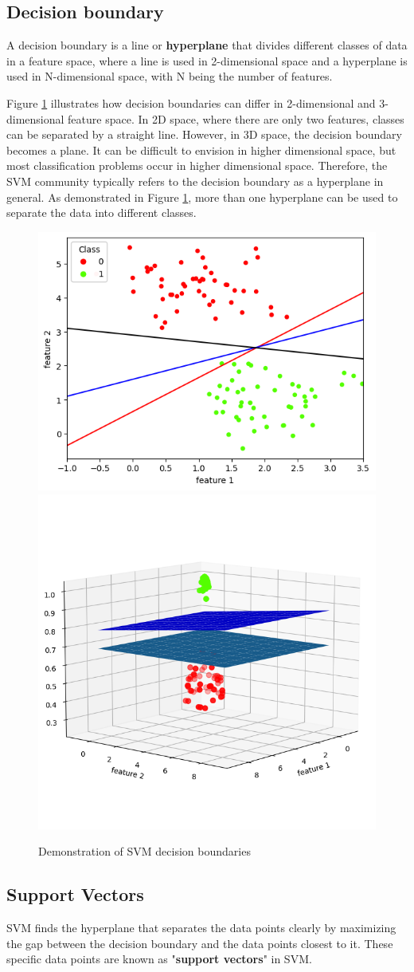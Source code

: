 \subsection{Decision boundary}
A decision boundary is a line or \textbf{hyperplane} that divides different classes of data in a feature space, where a line is used in 2-dimensional space and a hyperplane is used in N-dimensional space, with N being the number of features.

Figure \ref{fig:svmEg} illustrates how decision boundaries can differ in 2-dimensional and 3-dimensional feature space. In 2D space, where there are only two features, classes can be separated by a straight line. However, in 3D space, the decision boundary becomes a plane. It can be difficult to envision in higher dimensional space, but most classification problems occur in higher dimensional space. Therefore, the SVM community typically refers to the decision boundary as a hyperplane in general. As demonstrated in Figure \ref{fig:svmEg}, more than one hyperplane can be used to separate the data into different classes.

\begin{figure}[!h]
  \centering
  \includegraphics[width=4 cm]{svm_eg.png}
  \includegraphics[width=4 cm]{svm_eg3d.png}
  \caption{Demonstration of SVM decision boundaries}
  \label{fig:svmEg}
\end{figure}

\subsection{Support Vectors}

SVM finds the hyperplane that separates the data points clearly by maximizing the gap between the decision boundary and the data points closest to it. These specific data points are known as "\textbf{support vectors}" in SVM.

